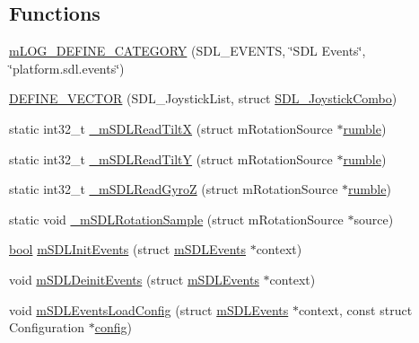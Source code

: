 \subsection*{Functions}
\begin{DoxyCompactItemize}
\item 
\mbox{\hyperlink{sdl-events_8c_a8d78a407dada6b4cee180d0eba20ef2c}{m\+L\+O\+G\+\_\+\+D\+E\+F\+I\+N\+E\+\_\+\+C\+A\+T\+E\+G\+O\+RY}} (S\+D\+L\+\_\+\+E\+V\+E\+N\+TS, \char`\"{}S\+DL Events\char`\"{}, \char`\"{}platform.\+sdl.\+events\char`\"{})
\item 
\mbox{\hyperlink{sdl-events_8c_aca1b25e3f45413ba1b117cc84937ede0}{D\+E\+F\+I\+N\+E\+\_\+\+V\+E\+C\+T\+OR}} (S\+D\+L\+\_\+\+Joystick\+List, struct \mbox{\hyperlink{sdl-events_8h_struct_s_d_l___joystick_combo}{S\+D\+L\+\_\+\+Joystick\+Combo}})
\item 
static int32\+\_\+t \mbox{\hyperlink{sdl-events_8c_a59d9838f0971eeb48f431096dc09f0a1}{\+\_\+m\+S\+D\+L\+Read\+TiltX}} (struct m\+Rotation\+Source $\ast$\mbox{\hyperlink{wii_2main_8c_a0be8203c70a7aa4a9c0029361e5d907b}{rumble}})
\item 
static int32\+\_\+t \mbox{\hyperlink{sdl-events_8c_a3fac3449468e84b4d3667c7b9468a1c7}{\+\_\+m\+S\+D\+L\+Read\+TiltY}} (struct m\+Rotation\+Source $\ast$\mbox{\hyperlink{wii_2main_8c_a0be8203c70a7aa4a9c0029361e5d907b}{rumble}})
\item 
static int32\+\_\+t \mbox{\hyperlink{sdl-events_8c_a3fc73cbd19f6b72781cd8d546ad22b64}{\+\_\+m\+S\+D\+L\+Read\+GyroZ}} (struct m\+Rotation\+Source $\ast$\mbox{\hyperlink{wii_2main_8c_a0be8203c70a7aa4a9c0029361e5d907b}{rumble}})
\item 
static void \mbox{\hyperlink{sdl-events_8c_af2e60a8e9c3fcba1e6310e13341ab656}{\+\_\+m\+S\+D\+L\+Rotation\+Sample}} (struct m\+Rotation\+Source $\ast$source)
\item 
\mbox{\hyperlink{libretro_8h_a4a26dcae73fb7e1528214a068aca317e}{bool}} \mbox{\hyperlink{sdl-events_8c_a0529db4419b332c04fea23fff2467774}{m\+S\+D\+L\+Init\+Events}} (struct \mbox{\hyperlink{sdl-events_8h_structm_s_d_l_events}{m\+S\+D\+L\+Events}} $\ast$context)
\item 
void \mbox{\hyperlink{sdl-events_8c_a619d2db362c7cc68e86f0428afc773c9}{m\+S\+D\+L\+Deinit\+Events}} (struct \mbox{\hyperlink{sdl-events_8h_structm_s_d_l_events}{m\+S\+D\+L\+Events}} $\ast$context)
\item 
void \mbox{\hyperlink{sdl-events_8c_aef6ce1dc9e5c4e9541747a55dc1ee383}{m\+S\+D\+L\+Events\+Load\+Config}} (struct \mbox{\hyperlink{sdl-events_8h_structm_s_d_l_events}{m\+S\+D\+L\+Events}} $\ast$context, const struct Configuration $\ast$\mbox{\hyperlink{deflate_8c_a4473b5227787415097004fd39f55185e}{config}})

\end{DoxyCompactItemize}
